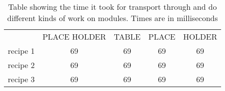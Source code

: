 \begin{table}[]
\centering
\begin{tabular}{ccccc}
\multicolumn{1}{l}{} & \multicolumn{1}{l}{PLACE HOLDER} & \multicolumn{1}{l}{TABLE} & \multicolumn{1}{l}{PLACE} & \multicolumn{1}{l}{HOLDER} \\
recipe 1             & 69                               & 69                        & 69                        & 69                         \\
recipe 2             & 69                               & 69                        & 69                        & 69                         \\
recipe 3             & 69                               & 69                        & 69                        & 69                        
\end{tabular}
\caption{Table showing the time it took for transport through and do different kinds of work on modules. Times are in milliseconds}
\label{tab:cp-time}
\end{table}